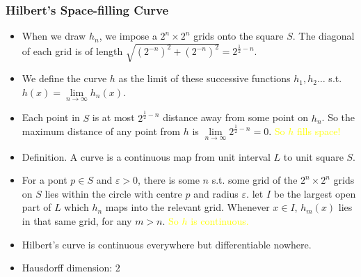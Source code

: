 \documentclass[UTF8,aspectratio=43,11pt,colorlinks,compress,openany]{beamer}%
\begin{document}
\begin{frame}\frametitle{Hilbert's Space-filling Curve}
\begin{itemize}
	\item When we draw $h_n$, we impose a $2^n\times 2^n$ grids onto the square $S$. The diagonal of each grid is of length $\sqrt{(2^{-n})^2+(2^{-n})^2}=2^{\frac{1}{2}-n}$.
	\item We define the curve $h$ as the limit of these successive functions $h_1,h_2\dots$ s.t. $h(x)=\lim\limits_{n\to\infty}h_n(x)$.
	\item Each point in $S$ is at most $2^{\frac{1}{2}-n}$ distance away from some point on $h_n$. So the maximum distance of any point from $h$ is $\lim\limits_{n\to\infty}2^{\frac{1}{2}-n}=0$. \textcolor{yellow}{So $h$ fills space!}
	\item Definition. A curve is a continuous map from unit interval $L$ to unit square $S$.
	\item For a pont $p\in S$ and $\varepsilon>0$, there is some $n$ s.t. some grid of the $2^n\times 2^n$ grids on $S$ lies within the circle with centre $p$ and radius $\varepsilon$. let $I$ be the largest open part of $L$ which $h_n$ maps into the relevant grid. Whenever $x\in I$, $h_m(x)$ lies in that same grid, for any $m>n$. \textcolor{yellow}{So $h$ is continuous.}
	\item Hilbert's curve is continuous everywhere but differentiable nowhere.
	\item Hausdorff dimension: $2$
\end{itemize}
\end{frame}
\end{document}
